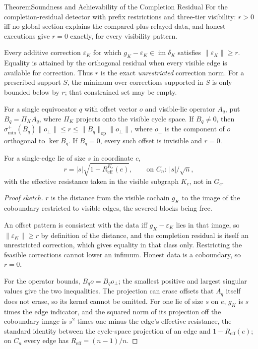 \documentclass[11pt,a4paper]{article}
\theoremstyle{definition}
\theoremstyle{remark}
\begin{document}
\begin{pdclaim}{Theorem}{Soundness and Achievability of the Completion Residual}
\setlength{\parskip}{4pt plus 1pt}
\label{thm:radius-soundness}
For the completion-residual detector with prefix restrictions and three-tier
visibility: $r>0$ iff no global section explains the compared-plus-relayed
data, and honest executions give $r=0$ exactly, for every visibility pattern.


Every additive correction $\varepsilon_K$ for which
$g_K-\varepsilon_K\in\operatorname{im}\delta_K$ satisfies
$\|\varepsilon_K\|\ge r$. Equality is attained by the orthogonal residual
when every visible edge is available for correction. Thus $r$ is the exact
\emph{unrestricted} correction norm. For a prescribed support $S$, the
minimum over corrections supported in $S$ is only bounded below by $r$;
that constrained set may be empty.

For a single equivocator $q$ with offset vector $o$ and visible-lie
operator $A_q$, put $B_q=\Pi_K A_q$, where $\Pi_K$ projects onto the visible
cycle space. If $B_q\ne0$, then
$\sigma^{+}_{\min}(B_q)\|o_\perp\|\le r\le\|B_q\|_{\mathrm{op}}\|o_\perp\|$,
where $o_\perp$ is the component of $o$ orthogonal to $\ker B_q$.
If $B_q=0$, every such offset is invisible and $r=0$.


For a single-edge
lie of size $s$ in coordinate $c$,
\[
r=|s|\sqrt{1-R^{K_c}_{\mathrm{eff}}(e)},\qquad\text{on } C_n:\ |s|/\sqrt n,
\]
with the effective resistance taken in the visible subgraph $K_c$, not in
$G_c$.
\end{pdclaim}
\begin{proof}[Proof sketch]
\setlength{\parskip}{4pt plus 1pt}
$r$ is the distance from the visible cochain $g_K$ to the image of the
coboundary restricted to visible edges, the severed blocks being free. 

An
offset pattern is consistent with the data iff $g_K-\varepsilon_K$ lies in that
image, so $\|\varepsilon_K\|\ge r$ by definition of the distance, and the
completion residual is itself an unrestricted correction, which gives equality
in that class only. Restricting the feasible corrections cannot lower an
infimum. Honest data
is a coboundary, so $r=0$. 

For the operator bounds, $B_qo=B_qo_\perp$;
the smallest positive and largest singular values give the two inequalities.
The projection can erase offsets that $A_q$ itself does not erase, so its
kernel cannot be omitted. For one lie of size $s$ on $e$, $g_K$ is $s$ times
the edge indicator, and the squared norm of its projection off the coboundary
image is $s^2$ times one minus the edge's effective resistance, the standard
identity between the cycle-space projection of an edge and
$1-R_{\mathrm{eff}}(e)$; on $C_n$ every edge has $R_{\mathrm{eff}}=(n-1)/n$.
\end{proof}
\end{document}
